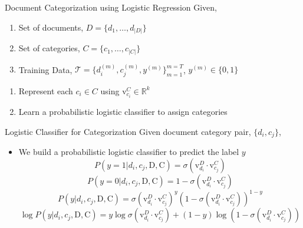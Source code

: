 \documentclass[10pt]{beamer}
\newcommand{\setD}{\ensuremath{D} }
\newcommand{\setC}{\ensuremath{C} }
\newcommand{\matD}{\ensuremath{\mathrm{D}} }
\newcommand{\matC}{\ensuremath{\mathrm{C}} }
\newcommand{\vecdi}[1]{\ensuremath{\mathrm{v}^{D}_{#1}}}
\newcommand{\vecci}[1]{\ensuremath{\mathrm{v}^{C}_{#1}}}
\newcommand{\traindata}{\ensuremath{\mathcal{T}}}
\begin{document}

\begin{frame}{Document Categorization using Logistic Regression}
Given,
\begin{enumerate}
	\vfill\item<1-> Set of documents, $\setD = \{d_{1}, \ldots, d_{|\setD|}\}$
	\vfill\item<2-> Set of categories, $\setC = \{c_{1}, \ldots, c_{|\setC|}\}$
	\vfill\item<3-> Training Data, $\traindata = \{ d^{(m)}_{i}, c^{(m)}_{j}, y^{(m)}\}^{m=T}_{m=1}$, $y^{(m)} \in \{0,1\}$
\end{enumerate}

\vfill{}

\begin{enumerate}
	\vfill\item<5-> Represent each $c_{i} \in \setC$ using $\vecci{c_{i}} \in \mathbb{R}^{k}$
	\vfill\item<6-> Learn a probabilistic logistic classifier to assign categories
\end{enumerate}

\end{frame}


\begin{frame}{Logistic Classifier for Categorization}
\vfill
\vfill{} {
 	Given document category pair, $\{d_{i}, c_{j}\}$,
}
\begin{itemize}
	\vfill\item<2-> We build a probabilistic logistic classifier to predict the label $y$
	\vfill\onslide<3-> { \begin{equation}
	P(y=1|d_{i}, c_{j}, \matD, \matC) = \sigma(\vecdi{d_{i}}\cdot \vecci{c_{j}})
	\end{equation} }
	\vfill\onslide<4-> { \begin{equation}
	P(y=0|d_{i}, c_{j}, \matD, \matC) = 1 - \sigma(\vecdi{d_{i}}\cdot \vecci{c_{j}})
	\end{equation} }
	\vfill\onslide<5-> { \begin{equation}
	P(y|d_{i}, c_{j}, \matD, \matC) = \sigma(\vecdi{d_{i}}\cdot \vecci{c_{j}})^{y}(1 - \sigma(\vecdi{d_{i}}\cdot \vecci{c_{j}}))^{1-y}
	\end{equation} }
	\vfill\onslide<6-> { \begin{equation}
	\log P(y|d_{i}, c_{j}, \matD, \matC) = y\log \sigma(\vecdi{d_{i}}\cdot \vecci{c_{j}}) + (1 - y)\log (1 - \sigma(\vecdi{d_{i}}\cdot \vecci{c_{j}}))
	\end{equation} }
\end{itemize}


\end{frame}
\end{document}
